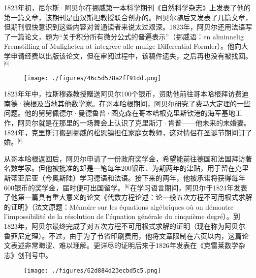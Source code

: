 1823年初，尼尔斯·阿贝尔在挪威第一本科学期刊《自然科学杂志》上发表了他的第一篇文章，该期刊是由汉斯坦教授联合创办的。阿贝尔随后又发表了几篇文章，但期刊很快意识到这些内容对普通读者来说太过艰深。1823年，阿贝尔还用法语写了一篇论文，题为“关于积分所有微分公式的普遍表示”（挪威语：en alminnelig Fremstilling af Muligheten at integrere alle mulige Differential-Formler）。他向大学申请经费以出版该论文，但在审阅过程中，该稿件遗失，之后再也没有被找回。\(^\text{[6]}\)
\begin{figure}[ht]
\centering
\texttt{[image: ./figures/46c5d578a2ff91dd.png]}
\caption{} \label{fig_NRSAB_3}
\end{figure}
1823年年中，拉斯穆森教授赠送阿贝尔100个银币，资助他前往哥本哈根拜访费迪南德·德根及当地其他数学家。在哥本哈根期间，阿贝尔研究了费马大定理的一些问题。他的舅舅佩德尔·曼德鲁普·图克森在哥本哈根克里斯钦港的海军基地工作，阿贝尔就是在那里的一场舞会上认识了克里斯汀·肯普——他未来的未婚妻。1824年，克里斯汀搬到挪威的松恩镇担任家庭女教师，这对情侣在圣诞节期间订了婚。\(^\text{[6]}\)

从哥本哈根返回后，阿贝尔申请了一份政府奖学金，希望能前往德国和法国拜访著名数学家。但他被批准的却是一笔每年200银币、为期两年的津贴，用于留在克里斯蒂亚尼亚（今奥斯陆）学习德语和法语。接下来的两年，他被承诺将获得每年600银币的奖学金，届时便可出国留学。\(^\text{[6]}\)在学习语言期间，阿贝尔于1824年发表了他第一篇具有重大意义的论文《代数方程论述：论一般五次方程不可用根式求解的证明》（法文原题：Mémoire sur les équations algébriques où on démontre l'impossibilité de la résolution de l'équation générale du cinquième degré）。到1823年，阿贝尔最终完成了对五次方程不可用根式求解的证明（现在称为阿贝尔–鲁菲尼定理）。不过，由于为了节省印刷费用，他将文章限制在六页以内，这篇论文表述非常晦涩、难以理解。更详尽的证明后来于1826年发表在《克雷莱数学杂志》创刊号中。
\begin{figure}[ht]
\centering
\texttt{[image: ./figures/62d884d23ecbd5c5.png]}
\caption{} \label{fig_NRSAB_4}
\end{figure}

